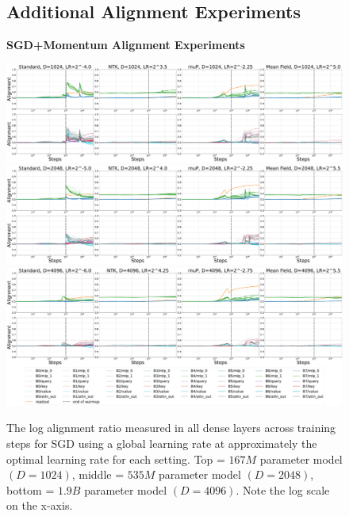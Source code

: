 \documentclass{article}
\theoremstyle{plain}
\theoremstyle{definition}
\theoremstyle{remark}
\begin{document}
\clearpage
\begin{figure}[ht]
\subsection{Additional Alignment Experiments}
\label{app:alignment_expts}
\figvspace
\figvspace
    \begin{center}
        \textbf{SGD+Momentum Alignment Experiments}\\
        \figvspace
        
        \includegraphics[width=\linewidth, trim={0, 0, 0, 0},clip]{icml2024/figures/alignment/appendix/sgdw_v2+momentum_1024.pdf}
       
        \figvspace
        \figvspace
       
        \includegraphics[width=\linewidth, trim={0, 0, 0, 0},clip]{icml2024/figures/alignment/appendix/sgdw_v2+momentum_2048.pdf}
       
        \figvspace
        \figvspace
       
        \includegraphics[width=\linewidth, trim={0, 0, 0, 0},clip]{icml2024/figures/alignment/appendix/sgdw_v2+momentum_4096_legend.pdf}
        \caption{The log alignment ratio measured in all dense layers across training steps for SGD using a global learning rate at approximately the optimal learning rate for each setting. Top = $167M$ parameter model $(D=1024)$, middle = $535M$ parameter model $(D=2048)$, bottom = $1.9B$ parameter model $(D=4096)$. Note the log scale on the x-axis.}
        \figvspace
        \label{fig:appendix_alignment_sgd}
    \end{center}
\end{figure}
\clearpage
\end{document}
